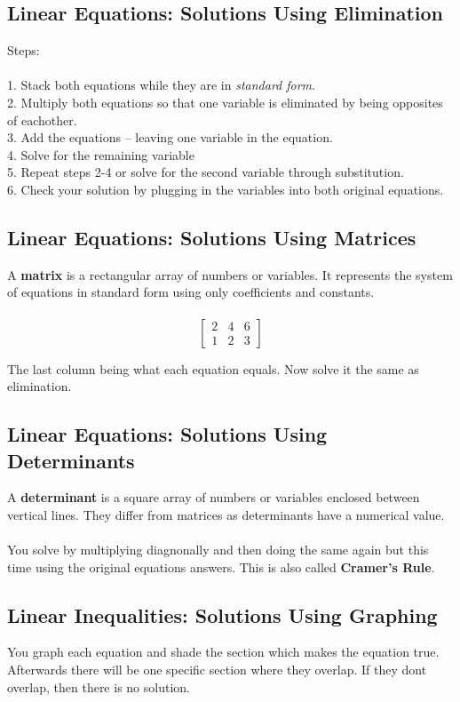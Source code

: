 \subsection{Linear Equations: Solutions Using Elimination}
Steps: \\\\
1. Stack both equations while they are in \textit{standard form}.\\
2. Multiply both equations so that one variable is eliminated by being opposites of eachother.\\
3. Add the equations -- leaving one variable in the equation.\\
4. Solve for the remaining variable\\
5. Repeat steps 2-4 or solve for the second variable through substitution.\\
6. Check your solution by plugging in the variables into both original equations.\\

\subsection{Linear Equations: Solutions Using Matrices}
A \textbf{matrix} is a rectangular array of numbers or variables. It represents the system of equations in standard form using only coefficients and constants.\\
\\
$$
\begin{bmatrix}
	2 & 4 & 6\\
	1 & 2 & 3
\end{bmatrix}
$$

The last column being what each equation equals. Now solve it the same as elimination.

\subsection{Linear Equations: Solutions Using Determinants}
A \textbf{determinant} is a square array of numbers or variables enclosed between vertical lines. They differ from matrices as determinants have a numerical value. \\
\\
You solve by multiplying diagnonally and then doing the same again but this time using the original equations answers. This is also called \textbf{Cramer's Rule}.
\\

\subsection{Linear Inequalities: Solutions Using Graphing}
You graph each equation and shade the section which makes the equation true. Afterwards there will be one specific section where they overlap. If they dont overlap, then there is no solution.
